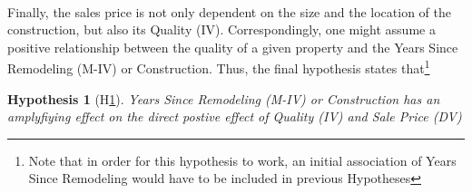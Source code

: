 \documentclass{article}
\newtheorem{hyp}{Hypothesis}
\begin{document}
\begin{center}
\end{center}


\indent \paragraph{} Finally, the sales price is not only dependent on the size and the location of the construction, but also its Quality (IV). Correspondingly, one might assume a positive relationship between the quality of a given property and the Years Since Remodeling (M-IV) or Construction. Thus, the final hypothesis states that\footnote{Note that in order for this hypothesis to work, an initial association of Years Since Remodeling would have to be included in previous Hypotheses}
\begin{hyp}[H\ref{hyp:third}] \label{hyp:third}
Years Since Remodeling (M-IV) or Construction has an amplyfiying effect on the direct postive effect of Quality (IV) and Sale Price (DV)
\end{hyp}

\begin{center}
\end{center}


\end{document}
